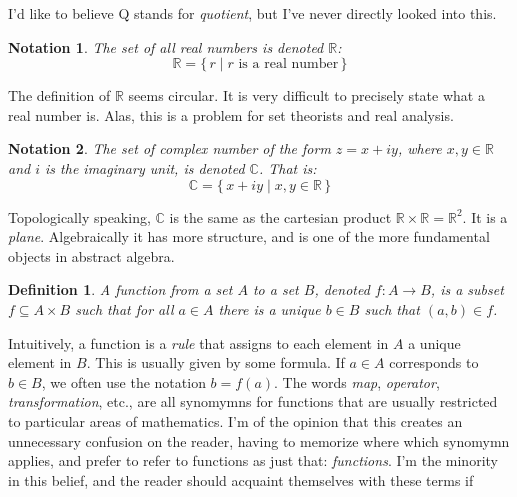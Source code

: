 \documentclass{article}
\theoremstyle{plain}
\theoremstyle{normal}
\newtheorem{definition}{Definition}[section]
\newtheorem{notation}{Notation}[section]
\begin{document}
        I'd like to believe Q stands for \textit{quotient}, but I've never
        directly looked into this.
        \begin{notation}
            \label{not:reals}%
            The set of all real numbers is denoted $\mathbb{R}$:
            \begin{equation}
                \mathbb{R}=\{\,r\;|\;r\textrm{ is a real number}\,\}
            \end{equation}
        \end{notation}
        The definition of $\mathbb{R}$ seems circular. It is very
        difficult to precisely state what a real number is. Alas, this is a
        problem for set theorists and real analysis.
        \begin{notation}
            The set of \textit{complex number} of the form $z=x+iy$, where
            $x,y\in\mathbb{R}$ and $i$ is the \textit{imaginary unit}, is
            denoted $\mathbb{C}$. That is:
            \begin{equation}
                \mathbb{C}=\{\,x+iy\;|\;x,y\in\mathbb{R}\,\}
            \end{equation}
        \end{notation}
        Topologically speaking, $\mathbb{C}$ is the same as the cartesian
        product $\mathbb{R}\times\mathbb{R}=\mathbb{R}^{2}$. It is a
        \textit{plane}. Algebraically it has more structure, and is one of the
        more fundamental objects in abstract algebra.
        \begin{definition}
            A \textit{function} from a set $A$ to a set $B$, denoted
            $f:A\rightarrow{B}$, is a subset
            $f\subseteq{A}\times{B}$ such that for all $a\in{A}$ there is a
            unique $b\in{B}$ such that $(a,b)\in{f}$.
        \end{definition}
        Intuitively, a function is a \textit{rule} that assigns to each element
        in $A$ a unique element in $B$. This is usually given by some formula.
        If $a\in{A}$ corresponds to $b\in{B}$, we often use the notation
        $b=f(a)$. The words \textit{map}, \textit{operator},
        \textit{transformation}, etc., are all synomymns for functions that are
        usually restricted to particular areas of mathematics. I'm of the
        opinion that this creates an unnecessary confusion on the reader,
        having to memorize where which synomymn applies, and prefer to refer
        to functions as just that: \textit{functions}. I'm the minority in this
        belief, and the reader should acquaint themselves with these terms if
\end{document}
